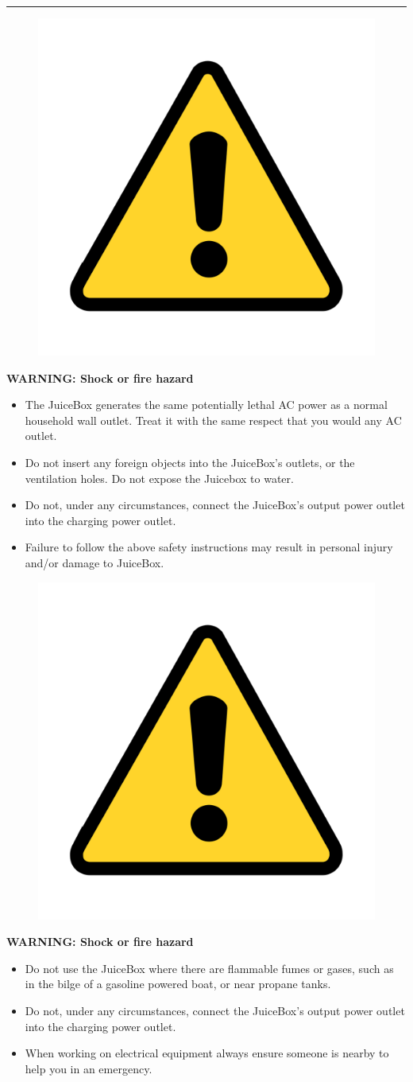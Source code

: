 \documentclass[10pt]{article}
\begin{document}
\hrule %
\begin{figure} %
    \centering
    \includegraphics[width=.75in]{warning_y} %
\end{figure}

\vspace{5mm}

\noindent   
\Large{\textbf{WARNING: Shock or fire hazard}} \\
\begin{large}                                        
	\begin{itemize}
		\item{ The JuiceBox generates the same potentially lethal AC power as a normal
			household wall outlet. Treat it with the same respect that you would any AC	
			outlet.}
		\item{Do not insert any foreign objects into the JuiceBox's outlets, or the ventilation holes. 
			Do not expose the Juicebox to water.}	
		\item{Do not, under any circumstances, connect the JuiceBox's output power outlet into the charging power outlet.}
		\item{Failure to follow the above safety instructions may result in personal injury
			and/or damage to JuiceBox.}
	\end{itemize}
\end{large}

\begin{figure}
    \centering
    \includegraphics[width=.75in]{warning_y}
\end{figure}

\vspace{5mm}

\noindent   
\Large{\textbf{WARNING: Shock or fire hazard}} \\
\begin{large}                                
	\begin{itemize}
		\item{ \leftskip=3cm Do not use the JuiceBox where there are flammable fumes or gases, such as
			in the bilge of a gasoline powered boat, or near propane tanks.}	
		\item{Do not, under any circumstances, connect the JuiceBox's output power outlet into the charging power outlet.}
		\item{When working on electrical equipment always ensure someone is nearby to
			help you in an emergency.}
	\end{itemize}
\end{large}
\end{document}
